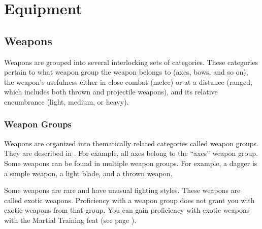 \chapter{Equipment}

\section{Weapons}\label{Weapons}

    Weapons are grouped into several interlocking sets of categories. These categories pertain to what weapon group the weapon belongs to (axes, bows, and so on), the weapon's usefulness either in close combat (melee) or at a distance (ranged, which includes both thrown and projectile weapons), and its relative encumbrance (light, medium, or heavy).

    \subsection{Weapon Groups}\label{Weapon Groups}

        Weapons are organized into thematically related categories called weapon groups. They are described in . For example, all axes belong to the ``axes'' weapon group. Some weapons can be found in multiple weapon groups. For example, a dagger is a simple weapon, a light blade, and a thrown weapon.

        \label{Exotic Weapons} Some weapons are rare and have unusual fighting styles.
        These weapons are called exotic weapons.
        Proficiency with a weapon group does not grant you with exotic weapons from that group.
        You can gain proficiency with exotic weapons with the Martial Training feat (see page ).

